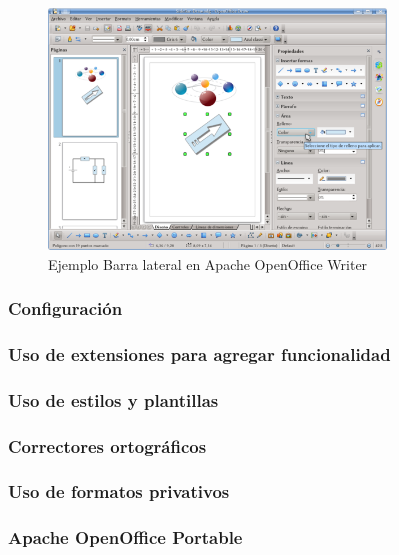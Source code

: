 \documentclass[12pt]{article}
\begin{document}
\begin{itemize}
\begin{figure}[H]
\centering
\includegraphics[width=0.8\textwidth]{barraLateralDrawOO.png}
\renewcommand{\figurename}{Fig.}
\caption{Ejemplo Barra lateral en Apache OpenOffice Writer}
\label{contexto:figura}
\end{figure}

\end{itemize}

\subsubsection*{Configuración}

\subsubsection*{Uso de extensiones para agregar funcionalidad}

\subsubsection*{Uso de estilos y plantillas}

\subsubsection*{Correctores ortográficos}

\subsubsection*{Uso de formatos privativos}

\subsubsection*{Apache OpenOffice Portable}
\end{document}
